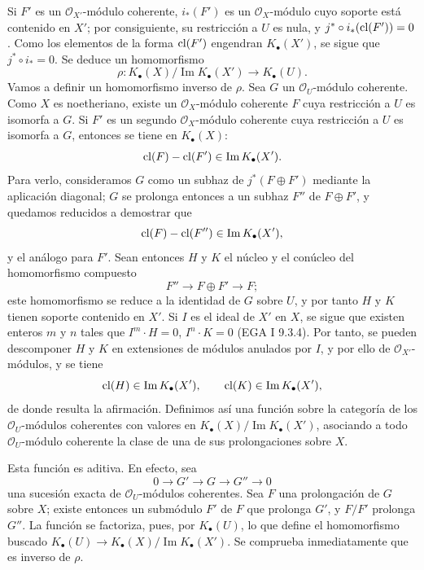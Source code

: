 Si $F'$ es un $\mathcal O_{X'}$-módulo coherente, $i_*(F')$ es un $\mathcal O_X$-módulo cuyo soporte está contenido en $X'$; por consiguiente, su restricción a $U$ es nula, y $j^*\circ i_*(\operatorname{cl}(F'))=0$. Como los elementos de la forma $\operatorname{cl}(F')$ engendran $K_\bullet(X')$, se sigue que $j^*\circ i_*=0$. Se deduce un homomorfismo
\[
 \rho:K_\bullet(X)/\operatorname{Im}K_\bullet(X')\longrightarrow K_\bullet(U).
\]
Vamos a definir un homomorfismo inverso de $\rho$. Sea $G$ un $\mathcal O_U$-módulo coherente. Como $X$ es noetheriano, existe un $\mathcal O_X$-módulo coherente $F$ cuya restricción a $U$ es isomorfa a $G$. Si $F'$ es un segundo $\mathcal O_X$-módulo coherente cuya restricción a $U$ es isomorfa a $G$, entonces se tiene en $K_\bullet(X)$:
\[
 \operatorname{cl}(F)-\operatorname{cl}(F')\in \operatorname{Im}K_\bullet(X').
\]
Para verlo, consideramos $G$ como un subhaz de $j^*(F\oplus F')$ mediante la aplicación diagonal; $G$ se prolonga entonces a un subhaz $F''$ de $F\oplus F'$, y quedamos reducidos a demostrar que
\[
 \operatorname{cl}(F)-\operatorname{cl}(F'')\in \operatorname{Im}K_\bullet(X'),
\]
y el análogo para $F'$. Sean entonces $H$ y $K$ el núcleo y el conúcleo del homomorfismo compuesto
\[
F''\longrightarrow F\oplus F'\longrightarrow F ;
\]
este homomorfismo se reduce a la identidad de $G$ sobre $U$, y por tanto $H$ y $K$ tienen soporte contenido en $X'$. Si $I$ es el ideal de $X'$ en $X$, se sigue que existen enteros $m$ y $n$ tales que $I^m\cdot H=0$, $I^n\cdot K=0$ (EGA I 9.3.4). Por tanto, se pueden descomponer $H$ y $K$ en extensiones de módulos anulados por $I$, y por ello de $\mathcal O_{X'}$-módulos, y se tiene
\[
\operatorname{cl}(H)\in \operatorname{Im}K_\bullet(X'),\qquad
\operatorname{cl}(K)\in \operatorname{Im}K_\bullet(X'),
\]
de donde resulta la afirmación. Definimos así una función sobre la categoría de los $\mathcal O_U$-módulos coherentes con valores en $K_\bullet(X)/\operatorname{Im}K_\bullet(X')$, asociando a todo $\mathcal O_U$-módulo coherente la clase de una de sus prolongaciones sobre $X$.

Esta función es aditiva. En efecto, sea
\[
0\longrightarrow G'\longrightarrow G\longrightarrow G''\longrightarrow 0
\]
una sucesión exacta de $\mathcal O_U$-módulos coherentes. Sea $F$ una prolongación de $G$ sobre $X$; existe entonces un submódulo $F'$ de $F$ que prolonga $G'$, y $F/F'$ prolonga $G''$. La función se factoriza, pues, por $K_\bullet(U)$, lo que define el homomorfismo buscado $K_\bullet(U)\to K_\bullet(X)/\operatorname{Im}K_\bullet(X')$. Se comprueba inmediatamente que es inverso de $\rho$.

